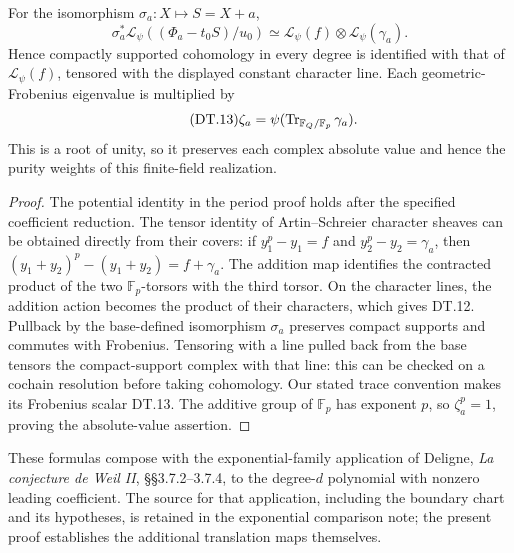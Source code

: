\begin{proposition}
For the isomorphism \(\sigma_a:X\mapsto S=X+a\),
\begin{equation}\tag{DT.12}
 \sigma_a^*\mathcal L_\psi((\Phi_a-t_0S)/u_0)
   \simeq\mathcal L_\psi(f)\otimes\mathcal L_\psi(\gamma_a).
\end{equation}
Hence compactly supported cohomology in every degree is identified
with that of \(\mathcal L_\psi(f)\), tensored with the displayed
constant character line. Each geometric-Frobenius eigenvalue is
multiplied by
\begin{equation}\tag{DT.13}
 \zeta_a=\psi(\operatorname{Tr}_{\mathbb F_Q/\mathbb F_p}\gamma_a).
\end{equation}
This is a root of unity, so it preserves each complex absolute value
and hence the purity weights of this finite-field realization.
\end{proposition}
\begin{proof}
The potential identity in the period proof holds after the specified
coefficient reduction. The tensor identity of Artin--Schreier character
sheaves can be obtained directly from their covers: if
\(y_1^p-y_1=f\) and \(y_2^p-y_2=\gamma_a\), then
\((y_1+y_2)^p-(y_1+y_2)=f+\gamma_a\). The addition map identifies
the contracted product of the two \(\mathbb F_p\)-torsors with the
third torsor. On the character lines, the addition action becomes the
product of their characters, which gives DT.12. Pullback by the
base-defined isomorphism \(\sigma_a\) preserves compact supports
and commutes with Frobenius. Tensoring with a line pulled back from
the base tensors the compact-support complex with that line: this
can be checked on a cochain resolution before taking cohomology.
Our stated trace convention makes its Frobenius scalar DT.13.
The additive group of \(\mathbb F_p\) has exponent \(p\), so
\(\zeta_a^p=1\), proving the absolute-value assertion.
\end{proof}

These formulas compose with the exponential-family application of
Deligne, \emph{La conjecture de Weil II}, \S\S3.7.2--3.7.4, to the
degree-\(d\) polynomial with nonzero leading coefficient. The source
for that application, including the boundary chart and its hypotheses,
is retained in the exponential comparison note; the present proof
establishes the additional translation maps themselves.

